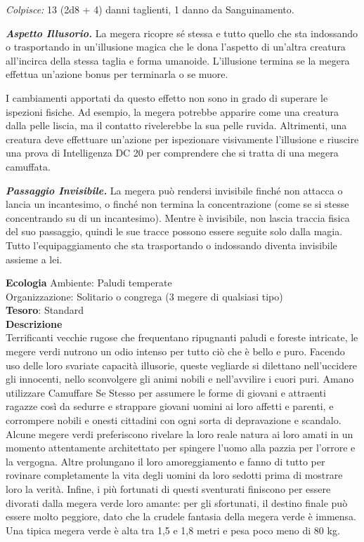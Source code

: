 \begin{multicols}{2}
\textit{Colpisce:} 13 (2d8 + 4) danni taglienti, 1 danno da Sanguinamento.

\textit{\textbf{Aspetto Illusorio.}} La megera ricopre sé stessa e tutto quello che sta indossando o trasportando in un'illusione magica che le dona l'aspetto di un'altra creatura all'incirca della stessa taglia e forma umanoide. L'illusione termina se la megera effettua un'azione bonus per terminarla o se muore.

I cambiamenti apportati da questo effetto non sono in grado di superare le ispezioni fisiche. Ad esempio, la megera potrebbe apparire come una creatura dalla pelle liscia, ma il contatto rivelerebbe la sua pelle ruvida. Altrimenti, una creatura deve effettuare un'azione per ispezionare visivamente l'illusione e riuscire una prova di Intelligenza DC 20 per comprendere che si tratta di una megera camuffata.

\textit{\textbf{Passaggio Invisibile.}} La megera può rendersi invisibile finché non attacca o lancia un incantesimo, o finché non termina la concentrazione (come se si stesse concentrando su di un incantesimo). Mentre è invisibile, non lascia traccia fisica del suo passaggio, quindi le sue tracce possono essere seguite solo dalla magia. Tutto l'equipaggiamento che sta trasportando o indossando diventa invisibile assieme a lei.

\textbf{Ecologia}
Ambiente: Paludi temperate\\
Organizzazione: Solitario o congrega (3 megere di qualsiasi tipo)\\
\textbf{Tesoro}: Standard\\
\textbf{Descrizione}\\
Terrificanti vecchie rugose che frequentano ripugnanti paludi e foreste intricate, le megere verdi nutrono un odio intenso per tutto ciò che è bello e puro. Facendo uso delle loro svariate capacità illusorie, queste vegliarde si dilettano nell'uccidere gli innocenti, nello sconvolgere gli animi nobili e nell'avvilire i cuori puri. Amano utilizzare Camuffare Se Stesso per assumere le forme di giovani e attraenti ragazze così da sedurre e strappare giovani uomini ai loro affetti e parenti, e corrompere nobili e onesti cittadini con ogni sorta di depravazione e scandalo. Alcune megere verdi preferiscono rivelare la loro reale natura ai loro amati in un momento attentamente architettato per spingere l'uomo alla pazzia per l'orrore e la vergogna. Altre prolungano il loro amoreggiamento e fanno di tutto per rovinare completamente la vita degli uomini da loro sedotti prima di mostrare loro la verità. Infine, i più fortunati di questi sventurati finiscono per essere divorati dalla megera verde loro amante: per gli sfortunati, il destino finale può essere molto peggiore, dato che la crudele fantasia della megera verde è immensa. Una tipica megera verde è alta tra 1,5 e 1,8 metri e pesa poco meno di 80 kg.



\end{multicols}
